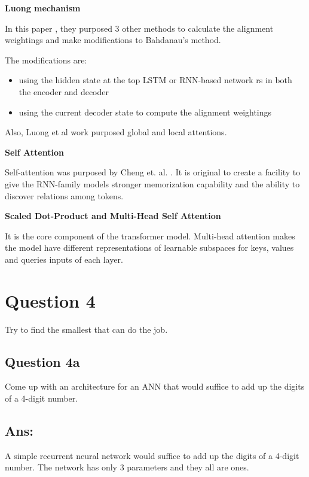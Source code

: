 \documentclass{kthreport}
\begin{document}
\textbf{Luong mechanism}

In this paper \cite{luong-etal-2015-effective},
they purposed 3 other methods to calculate the alignment weightings
and make modifications to Bahdanau's method.

The modifications are:
\begin{itemize}
    \item using the hidden state at the top LSTM or RNN-based network rs in both the encoder and decoder
    \item using the current decoder state to compute the alignment weightings
\end{itemize}

Also, Luong et al work \cite{luong-etal-2015-effective} purposed global and local attentions.

\textbf{Self Attention}

Self-attention was purposed by Cheng et. al. \cite{cheng-etal-2016-long}. It is
original to create a facility to give the RNN-family models stronger memorization
capability and the ability to discover relations among tokens.

\textbf{Scaled Dot-Product and Multi-Head Self Attention}

It is the core component of the transformer model. \cite{vaswani2017attention}
Multi-head attention makes the model have different representations of
learnable subspaces for keys, values and queries inputs of each layer.




\section{Question 4}
Try to find the smallest that can do the job.

\subsection{Question 4a}
Come up with an architecture for an ANN that would suffice to add up the digits of a 4-digit number.

\subsection*{Ans:}
A simple recurrent neural network would suffice to add up the digits of a 4-digit number.
The network has only 3 parameters and they all are ones.
\end{document}
